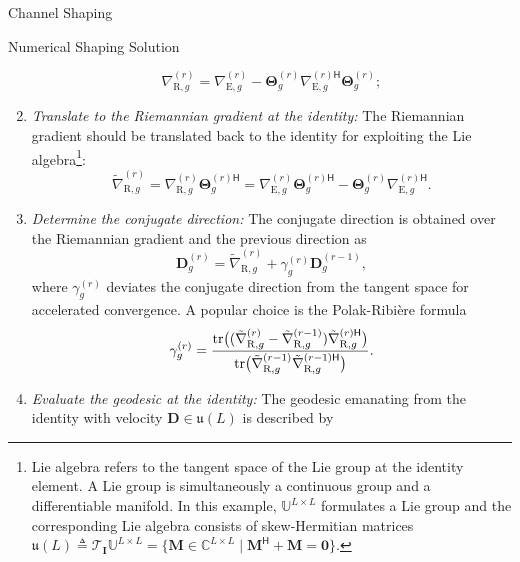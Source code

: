 \documentclass[journal]{IEEEtran}
\begin{document}
\begin{section}{Channel Shaping}
\begin{subsection}{Numerical Shaping Solution}
\begin{enumerate}[label=(\roman*)]
				\begin{equation}
					\label{eq:gradient_riem}
					\nabla_{\mathrm{R},g}^{(r)} = \nabla_{\mathrm{E},g}^{(r)} - \mathbf{\Theta}_g^{(r)} {\nabla_{\mathrm{E},g}^{(r)\mathsf{H}}} \mathbf{\Theta}_g^{(r)};
				\end{equation}
			\item \emph{Translate to the Riemannian gradient at the identity:} The Riemannian gradient should be translated back to the identity for exploiting the Lie algebra\footnote{Lie algebra refers to the tangent space of the Lie group at the identity element. A Lie group is simultaneously a continuous group and a differentiable manifold. In this example, $\mathbb{U}^{L \times L}$ formulates a Lie group and the corresponding Lie algebra consists of skew-Hermitian matrices $\mathfrak{u}(L) \triangleq \mathcal{T}_{\mathbf{I}}\mathbb{U}^{L \times L} = \{\mathbf{M} \in \mathbb{C}^{L \times L} \mid \mathbf{M}^\mathsf{H} + \mathbf{M} = \mathbf{0}\}$.}:
				\begin{equation}
					\label{eq:gradient_riem_tran}
					\tilde{\nabla}_{\mathrm{R},g}^{(r)} = \nabla_{\mathrm{R},g}^{(r)} \mathbf{\Theta}_g^{(r)\mathsf{H}} = \nabla_{\mathrm{E},g}^{(r)} \mathbf{\Theta}_g^{(r)\mathsf{H}} - \mathbf{\Theta}_g^{(r)} {\nabla_{\mathrm{E},g}^{(r)\mathsf{H}}}.
				\end{equation}
			\item \emph{Determine the conjugate direction:} The conjugate direction is obtained over the Riemannian gradient and the previous direction as
				\begin{equation}
					\label{eq:conjugate_dirn_geod}
					{\mathbf{D}}_g^{(r)} = \tilde{\nabla}_{\mathrm{R},g}^{(r)} + {\gamma}_g^{(r)} {\mathbf{D}}_g^{(r-1)},
				\end{equation}
				where $\gamma_g^{(r)}$ deviates the conjugate direction from the tangent space for accelerated convergence. A popular choice is the Polak-Ribi\`{e}re formula \cite{Hager2006}
				\begin{equation}
					\label{eq:conjugate_parm_geod}
					{\gamma}_g^{(r)} = \frac{\tr\bigl((\tilde{\nabla}_{\mathrm{R},g}^{(r)} - \tilde{\nabla}_{\mathrm{R},g}^{(r-1)}) {\tilde{\nabla}_{\mathrm{R},g}^{(r)\mathsf{H}}}\bigr)}{\tr\bigl(\tilde{\nabla}_{\mathrm{R},g}^{(r-1)} {\tilde{\nabla}_{\mathrm{R},g}^{(r-1)\mathsf{H}}}\bigr)}. %
				\end{equation}
			\item \emph{Evaluate the geodesic at the identity:} The geodesic emanating from the identity with velocity $\mathbf{D} \in \mathfrak{u}(L)$ is described by

\end{enumerate}
\end{subsection}
\end{section}
\end{document}
